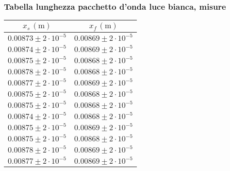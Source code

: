 \subsubsection{Tabella lunghezza pacchetto d'onda luce bianca, misure}
    \begin{table}[H]
    \centering
        \begin{tabular}{|c|c|}
        \hline
        $ x_s \, (\text{m}) $ & $ x_f \, (\text{m}) $ \\
        \hline
        $0.00873 \pm 2 \cdot 10^{-5}$ & $0.00869 \pm 2 \cdot 10^{-5}$ \\
        \hline
        $0.00874 \pm 2 \cdot 10^{-5}$ & $0.00869 \pm 2 \cdot 10^{-5}$ \\
        \hline
        $0.00875 \pm 2 \cdot 10^{-5}$ & $0.00868 \pm 2 \cdot 10^{-5}$ \\
        \hline
        $0.00878 \pm 2 \cdot 10^{-5}$ & $0.00868 \pm 2 \cdot 10^{-5}$ \\
        \hline
        $0.00877 \pm 2 \cdot 10^{-5}$ & $0.00869 \pm 2 \cdot 10^{-5}$ \\
        \hline
        $0.00875 \pm 2 \cdot 10^{-5}$ & $0.00868 \pm 2 \cdot 10^{-5}$ \\
        \hline
        $0.00875 \pm 2 \cdot 10^{-5}$ & $0.00868 \pm 2 \cdot 10^{-5}$ \\
        \hline
        $0.00874 \pm 2 \cdot 10^{-5}$ & $0.00868 \pm 2 \cdot 10^{-5}$ \\
        \hline
        $0.00875 \pm 2 \cdot 10^{-5}$ & $0.00869 \pm 2 \cdot 10^{-5}$ \\
        \hline
        $0.00875 \pm 2 \cdot 10^{-5}$ & $0.00868 \pm 2 \cdot 10^{-5}$ \\
        \hline
        $0.00878 \pm 2 \cdot 10^{-5}$ & $0.00869 \pm 2 \cdot 10^{-5}$ \\
        \hline
        $0.00877 \pm 2 \cdot 10^{-5}$ & $0.00869 \pm 2 \cdot 10^{-5}$ \\
        \hline
        \end{tabular}
    \end{table}

